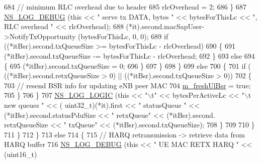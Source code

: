 \begin{DoxyCode}
684                                   \textcolor{comment}{// minimum RLC overhead due to header}
685                                   rlcOverhead = 2;
686                                 \}
687                               \hyperlink{group__logging_ga413f1886406d49f59a6a0a89b77b4d0a}{NS\_LOG\_DEBUG} (\textcolor{keyword}{this} << \textcolor{stringliteral}{" serve tx DATA, bytes "} << bytesForThisLc 
      << \textcolor{stringliteral}{", RLC overhead "} << rlcOverhead);
688                               (*it).second.macSapUser->NotifyTxOpportunity (bytesForThisLc, 0, 0);
689                               \textcolor{keywordflow}{if} ((*itBsr).second.txQueueSize >= bytesForThisLc - rlcOverhead)
690                                 \{
691                                   (*itBsr).second.txQueueSize -= bytesForThisLc - rlcOverhead;
692                                 \}
693                               \textcolor{keywordflow}{else}
694                                 \{
695                                   (*itBsr).second.txQueueSize = 0;
696                                 \}
697                             \}
698                         \}
699                       \textcolor{keywordflow}{else}
700                         \{
701                           \textcolor{keywordflow}{if} ( ((*itBsr).second.retxQueueSize > 0) || ((*itBsr).second.txQueueSize > 0)) 
702                             \{
703                               \textcolor{comment}{// resend BSR info for updating eNB peer MAC}
704                               \hyperlink{classns3_1_1LteUeMac_aca794e82bda10d6cdd9e5ffbbb7b11bc}{m\_freshUlBsr} = \textcolor{keyword}{true};
705                             \}
706                         \}
707                       \hyperlink{group__logging_ga88acd260151caf2db9c0fc84997f45ce}{NS\_LOG\_LOGIC} (\textcolor{keyword}{this} << \textcolor{stringliteral}{"\(\backslash\)t"} << bytesPerActiveLc << \textcolor{stringliteral}{"\(\backslash\)t new queues "} << (
      uint32\_t)(*it).first << \textcolor{stringliteral}{" statusQueue "} << (*itBsr).second.statusPduSize << \textcolor{stringliteral}{" retxQueue"} << (*itBsr).second.
      retxQueueSize << \textcolor{stringliteral}{" txQueue"} <<  (*itBsr).second.txQueueSize);
708                     \}
709 
710                 \}
711             \}
712         \}
713       \textcolor{keywordflow}{else}
714         \{
715           \textcolor{comment}{// HARQ retransmission -> retrieve data from HARQ buffer}
716           \hyperlink{group__logging_ga413f1886406d49f59a6a0a89b77b4d0a}{NS\_LOG\_DEBUG} (\textcolor{keyword}{this} << \textcolor{stringliteral}{" UE MAC RETX HARQ "} << (uint16\_t)

\end{DoxyCode}
